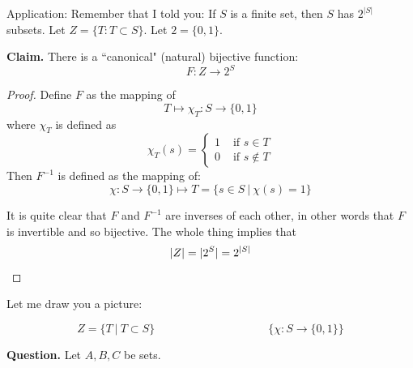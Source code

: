 \documentclass[10pt]{scrartcl}
\begin{document}
Application: Remember that I told you: If $S$ is a finite set, then $S$ has $2^{|S|}$ subsets. Let $Z = \{T: T \subset S\}$. Let $2 = \{0,1\}$. 

\textbf{Claim.} There is a ``canonical" (natural) bijective function: 
\[F: Z \to 2^{S}\]
\begin{proof}
Define $F$ as the mapping of
\[T \longmapsto \chi_T: S \to \{0,1\}\]
where $\chi_T$ is defined as 
\[\chi_T(s) = \begin{cases} 
 1 &\text{ if } s \in T\\
 0 &\text{ if } s \not\in T	
 \end{cases}
\]
Then $F^{-1}$ is defined as the mapping of:
\[\chi:S \to \{0,1\} \longmapsto T = \{s \in S ~|~ \chi(s) = 1\}\]

It is quite clear that $F$ and $F^{-1}$ are inverses of each other, in other words that $F$ is invertible and so bijective. The whole thing implies that 
\[|Z| = |2^S| = 2^{|S|}\qedhere\]	
\end{proof}

Let me draw you a picture: 

\[Z = \{T ~|~ T \subset S\} \qquad \qquad \qquad \qquad \qquad \{\chi: S \to \{0,1\}\}\]
\begin{center}
	
\end{center}


\textbf{Question.} Let $A,B,C$ be sets.
\end{document}
